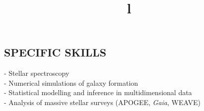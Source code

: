\documentclass[margin]{res}
\begin{document}
\begin{resume}
\section{SPECIFIC SKILLS}
- Stellar spectroscopy\\
- Numerical simulations of galaxy formation\\
- Statistical modelling and inference in multidimensional data\\
- Analysis of massive stellar surveys (APOGEE, \emph{Gaia}, WEAVE) \\
\\


\begin{format}
\title{l}\\
\\
\body\\
\end{format}


\end{resume}
\end{document}
